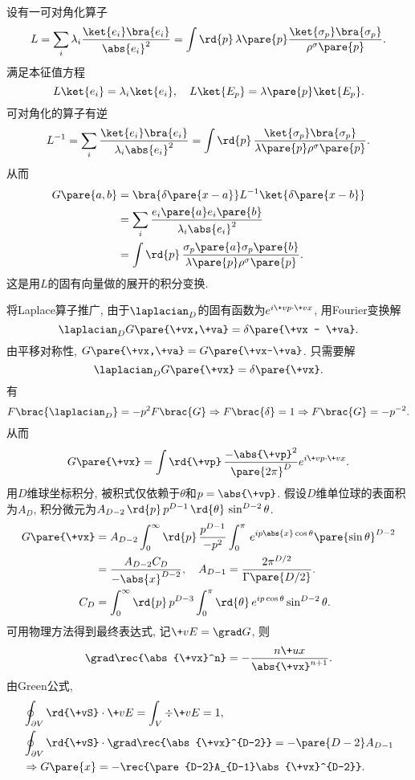 \documentclass[hidelinks]{ctexart}
\begin{document}
\newpoint{}设有一可对角化算子
\[ L = \sum_i \lambda_i \frac{\ket{e_i}\bra{e_i}}{\abs{e_i}^2} = \int \rd{p}\, \lambda\pare{p} \frac{\ket{\sigma_p}\bra{\sigma_p}}{\rho^\sigma\pare{p}}. \]
满足本征值方程
\[ L\ket{e_i} = \lambda_i \ket{e_i},\quad L\ket{E_p} = \lambda\pare{p}\ket{E_p}. \]
\newpoint{}可对角化的算子有逆
\[ L^{-1} = \sum_i \frac{\ket{e_i}\bra{e_i}}{\lambda_i \abs{e_i}^2} = \int \rd{p}\,\frac{\ket{\sigma_p}\bra{\sigma_p}}{\lambda\pare{p}\rho^\sigma\pare{p}}. \]
从而
\begin{align*}
    G\pare{a,b} &= \bra{\delta\pare{x-a}}L^{-1}\ket{\delta\pare{x-b}} \\
    &= \sum_i \frac{e_i\pare{a}e_i\pare{b}}{\lambda_i\abs{e_i}^2} \\
    &= \int \rd{p}\, \frac{\sigma_p\pare{a}\sigma_p\pare{b}}{\lambda\pare{p}\rho^\sigma\pare{p}}.
\end{align*}
这是用$L$的固有向量做的展开的积分变换.
\begin{sample}
    \begin{ex}
        将Laplace算子推广, 由于$\laplacian_D$的固有函数为$e^{i\+vp\cdot \+vx}$, 用Fourier变换解
        \[ \laplacian_D G\pare{\+vx,\+va} = \delta\pare{\+vx - \+va}. \]
        由平移对称性, $G\pare{\+vx,\+va} = G\pare{\+vx-\+va}$. 只需要解
        \[ \laplacian_D G\pare{\+vx} = \delta\pare{\+vx}. \]
        有
        \[ F\brac{\laplacian_D} = -p^2 F\brac{G} \Rightarrow F\brac{\delta} = 1 \Rightarrow F\brac{G} = -p^{-2}. \]
        从而
        \[ G\pare{\+vx} = \int \rd{\+vp}\, \frac{-\abs{\+vp}^2}{\pare{2\pi}^D}e^{i\+vp\cdot \+vx}. \]
        用$D$维球坐标积分, 被积式仅依赖于$\theta$和$p = \abs{\+vp}$. 假设$D$维单位球的表面积为$A_D$, 积分微元为$A_{D-2} \,\rd{p}\, p^{D-1}\,\rd{\theta}\,\sin^{D-2}\theta$.
        \begin{align*}
            G\pare{\+vx} &= A_{D-2}\int_0^\infty \rd{p}\, \frac{p^{D-1}}{-p^2} \int_0^\pi\, e^{ip\abs{x}\cos\theta}\pare{\sin\theta}^{D-2} \\
            &= \frac{A_{D-2}C_D}{-\abs{x}^{D-2}},\quad A_{D-1} = \frac{2\pi^{D/2}}{\Gamma\pare{D/2}}. \\
            C_D &= \int_0^\infty \rd{p}\, p^{D-3}\int_0^\pi \rd{\theta}\, e^{ip\cos\theta}\sin^{D-2}\theta.
        \end{align*}
        可用物理方法得到最终表达式, 记$\+vE = \grad G$, 则
        \[ \grad \rec{\abs{\+vx}^n} = -\frac{n\+ux}{\abs{\+vx}^{n+1}}. \]
        由Green公式,
        \begin{align*}
            & \oint_{\partial V} \rd{\+vS}\cdot \+vE = \int_V \div \+vE = 1, \\
            & \oint_{\partial V} \rd{\+vS} \cdot \grad \rec{\abs{\+vx}^{D-2}} = -\pare{D-2}A_{D-1} \\
            & \Rightarrow G\pare{x} = -\rec{\pare{D-2}A_{D-1}\abs{\+vx}^{D-2}}.
        \end{align*}
    \end{ex}
\end{sample}


\end{document}
